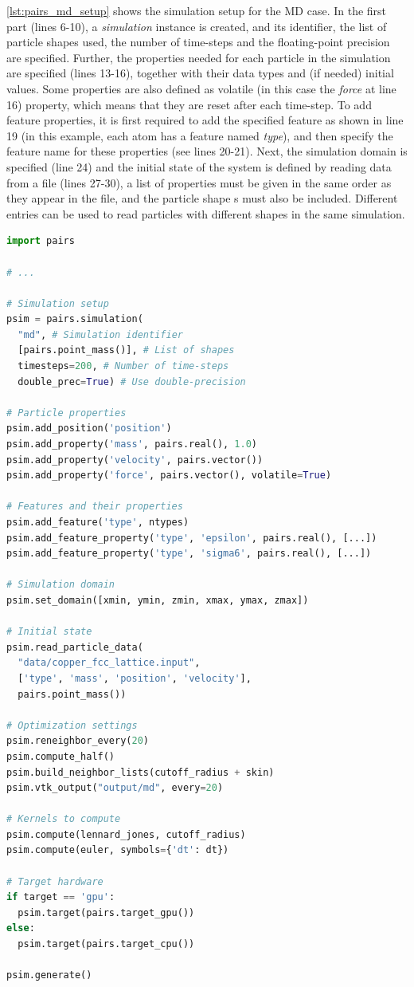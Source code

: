 \documentclass[Afour,sageh,times]{sagej}
\newcommand{\RMchange}[1]{{\color{blue} #1}}
\begin{document}
\autoref{lst:pairs_md_setup} shows the simulation setup for the \ac{MD} case. In the first part (lines 6-10), a \emph{simulation} instance is created, and its identifier, the list of particle shapes used, the number of time-steps and the floating-point precision are specified.
Further, the properties needed for each particle in the simulation are specified (lines 13-16), together with their data types and (if needed) initial values.
Some properties are also defined as volatile (in this case the \emph{force} at line 16) property, which means \RMchange{that} they are reset after \RMchange{each} time-step.
To add feature properties, it is first required to add the specified feature as shown in line 19 (in this example, each atom has a feature named \emph{type}), and then specify the feature name for these properties (see lines 20-21).
Next, the simulation domain is specified (line 24) and the initial state of the system is defined by reading data from a file (lines 27-30), a list of properties must be given in the same order as they appear in the file, and the particle shape\RMchange{s} must also be included.
Different entries can be used to read particles with different shapes in the same simulation.

\begin{lstlisting}[language=Python,
		   label={lst:pairs_md_setup},
		   caption={Simple example for MD simulation setup in P4IRS.}]
import pairs

# ...

# Simulation setup
psim = pairs.simulation(
  "md", # Simulation identifier
  [pairs.point_mass()], # List of shapes
  timesteps=200, # Number of time-steps
  double_prec=True) # Use double-precision

# Particle properties
psim.add_position('position')
psim.add_property('mass', pairs.real(), 1.0)
psim.add_property('velocity', pairs.vector())
psim.add_property('force', pairs.vector(), volatile=True)

# Features and their properties
psim.add_feature('type', ntypes)
psim.add_feature_property('type', 'epsilon', pairs.real(), [...])
psim.add_feature_property('type', 'sigma6', pairs.real(), [...])

# Simulation domain
psim.set_domain([xmin, ymin, zmin, xmax, ymax, zmax])

# Initial state
psim.read_particle_data(
  "data/copper_fcc_lattice.input",
  ['type', 'mass', 'position', 'velocity'],
  pairs.point_mass())

# Optimization settings
psim.reneighbor_every(20)
psim.compute_half()
psim.build_neighbor_lists(cutoff_radius + skin)
psim.vtk_output("output/md", every=20)

# Kernels to compute
psim.compute(lennard_jones, cutoff_radius)
psim.compute(euler, symbols={'dt': dt})

# Target hardware
if target == 'gpu':
  psim.target(pairs.target_gpu())
else:
  psim.target(pairs.target_cpu())

psim.generate()
\end{lstlisting}
\end{document}
